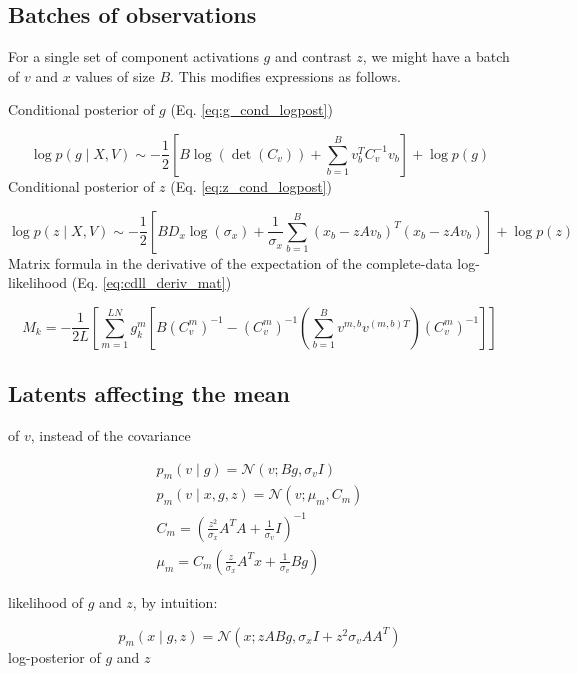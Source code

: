 \documentclass{paper}
\begin{document}
\subsection{Batches of observations}

For a single set of component activations $g$ and contrast $z$, we might have a batch of $v$ and $x$ values of size $B$. This modifies expressions as follows.

Conditional posterior of $g$ (Eq. \ref{eq:g_cond_logpost})

\begin{equation} 
\log p(g \mid X,V) \sim -\frac{1}{2} \left[B\log(\det(C_v)) + \sum_{b=1}^B v_b^T C_v^{-1} v_b\right] + \log p(g)
\end{equation}
%
Conditional posterior of $z$ (Eq. \ref{eq:z_cond_logpost})

\begin{equation} 
\log p(z \mid X,V) \sim -\frac{1}{2} \left[B D_x\log(\sigma_x) + \frac{1}{\sigma_x} \sum_{b=1}^B (x_b - zAv_b)^T (x_b - zAv_b)\right] + \log p(z)
\end{equation}
Matrix formula in the derivative of the expectation of the complete-data log-likelihood (Eq. \ref{eq:cdll_deriv_mat})

\begin{equation}
M_k = -\frac{1}{2L} \left[ \sum_{m=1}^{LN} g_k^{m} \left[ B \left( C_v^m \right)^{-1} -  \left( C_v^m \right)^{-1} \left( \sum_{b=1}^B v^{m,b} v^{(m,b)T} \right) \left( C_v^m \right)^{-1} \right]\right]
\end{equation}

\subsection{Latents affecting the mean}

of $v$, instead of the covariance

\begin{eqnarray}
p_m(v \mid g) = \mathcal{N}(v; Bg,\sigma_v I) \\
p_m(v \mid x,g,z) = \mathcal{N}(v;\mu_m,C_m) \\
C_m =  \left(\frac{z^2}{\sigma_x} A^T A + \frac{1}{\sigma_v} I \right)^{-1} \\
\mu_m = C_m \left(\frac{z}{\sigma_x} A^T x +  \frac{1}{\sigma_v} B g \right)
\end{eqnarray}

likelihood of $g$ and $z$, by intuition:

\begin{equation}
p_m(x \mid g,z) = \mathcal{N}(x; zABg, \sigma_x I + z^2 \sigma_v AA^T)
\end{equation}
%
log-posterior of $g$ and $z$
\end{document}
